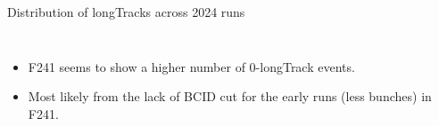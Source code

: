 \begin{frame}{Distribution of longTracks across 2024 runs}
\begin{columns}
\begin{column}{0.55 \linewidth}
\begin{figure}
			\end{figure}
		\end{column}
	\end{columns}
	\begin{itemize}
		\item F241 seems to show a higher number of 0-longTrack events.
		\item Most likely from the lack of BCID cut for the early runs (less bunches) in F241.
	\end{itemize}
\end{frame}



